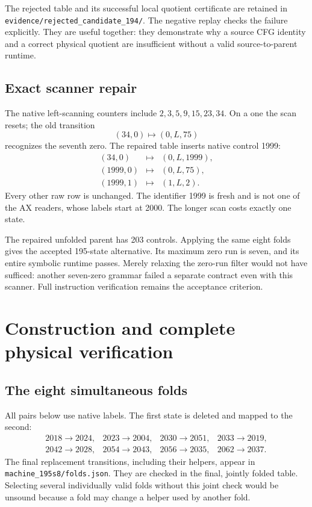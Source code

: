 \documentclass[11pt,letterpaper]{article}
\newcommand{\file}[1]{\texttt{\nolinkurl{#1}}}
\begin{document}
The rejected table and its successful local quotient certificate are
retained in \file{evidence/rejected_candidate_194/}.
The negative replay checks the failure explicitly.
They are useful together: they demonstrate why a source CFG identity
and a correct physical quotient are insufficient without a valid
source-to-parent runtime.

\subsection{Exact scanner repair}
The native left-scanning counters include
$2,3,5,9,15,23,34$. On a one the scan resets; the old transition
\[
 (34,0)\mapsto(0,L,75)
\]
recognizes the seventh zero. The repaired table inserts native control
1999:
\[
\begin{array}{rcl}
(34,0)&\mapsto&(0,L,1999),\\
(1999,0)&\mapsto&(0,L,75),\\
(1999,1)&\mapsto&(1,L,2).
\end{array}
\]
Every other raw row is unchanged. The identifier 1999 is fresh and is
not one of the AX readers, whose labels start at 2000.
The longer scan costs exactly one state.

The repaired unfolded parent has 203 controls. Applying the same eight
folds gives the accepted 195-state alternative. Its maximum zero run
is seven, and its entire symbolic runtime passes. Merely relaxing the
zero-run filter would not have sufficed: another seven-zero grammar
failed a separate contract even with this scanner. Full instruction
verification remains the acceptance criterion.

\section{Construction and complete physical verification}
\label{sec:physical}
\subsection{The eight simultaneous folds}
All pairs below use native labels. The first state is deleted and mapped
to the second:
\[
\begin{array}{rrrr}
2018\to2024,&2023\to2004,&2030\to2051,&2033\to2019,\\
2042\to2028,&2054\to2043,&2056\to2035,&2062\to2037.
\end{array}
\]
The final replacement transitions, including their helpers, appear in
\file{machine_195s8/folds.json}. They are checked in the final, jointly
folded table. Selecting several individually valid folds without this
joint check would be unsound because a fold may change a helper used
by another fold.
\end{document}

